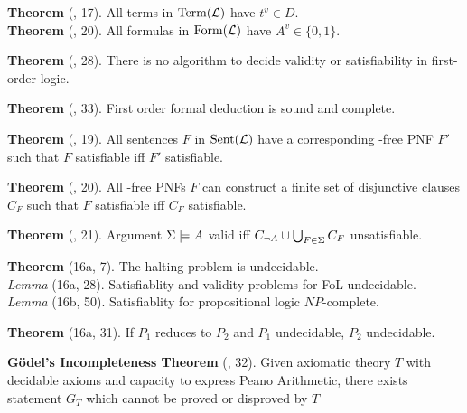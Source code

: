 \documentclass[class=cs245,nogeometry]{agony}
\newcommand{\thm}[3][Theorem]{\textbf{#1} (\textsection #2, #3).}
\newcommand{\lem}[2]{\textit{Lemma} (\textsection #1, #2).}
\begin{document}
\begin{multicols}{2}
  \thm{12}{17} All terms in $\operatorname{Term}(\mathcal{L})$ have $t^v \in D$. \\
  \thm{12}{20} All formulas in $\operatorname{Form}(\mathcal{L})$ have $A^v \in \{0,1\}$.

  \thm{12}{28} There is no algorithm to decide validity or satisfiability in first-order logic.

  \thm{14}{33} First order formal deduction is sound and complete.

  \thm{15}{19} All sentences $F$ in $\operatorname{Sent}(\mathcal{L})$ have a corresponding \X{}-free PNF $F'$
  such that $F$ satisfiable iff $F'$ satisfiable.

  \thm{15}{20} All \X{}-free PNFs $F$ can construct a finite set of disjunctive clauses
  $C_F$ such that $F$ satisfiable iff $C_F$ satisfiable.

  \thm{15}{21} Argument $\Sigma \models A$ valid iff $C_{\lnot A} \cup \bigcup_{F\in \Sigma}C_F$ unsatisfiable.

  \thm{16a}{7} The halting problem is undecidable. \\
  \lem{16a}{28} Satisfiablity and validity problems for FoL undecidable. \\
  \lem{16b}{50} Satisfiablity for propositional logic $NP$-complete.

  \thm{16a}{31} If $P_1$ reduces to $P_2$ and $P_1$ undecidable, $P_2$ undecidable.

  \thm[G\"odel's Incompleteness Theorem]{17}{32} Given axiomatic theory $T$
  with decidable axioms and capacity to express Peano Arithmetic,
  there exists statement $G_T$ which cannot be proved or disproved by $T$
\end{multicols}
\end{document}
